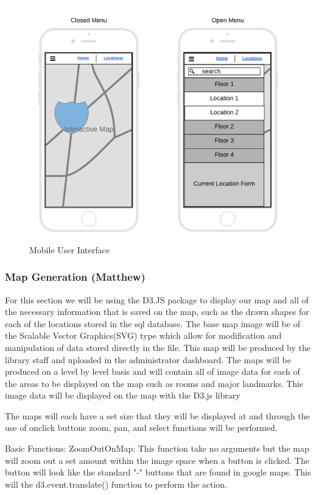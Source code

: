 \documentclass[letterpaper,10pt,titlepage, onecolumn, compsoc]{IEEEtran}
\begin{document}
\begin{figure}[h!]
\centering
\includegraphics[scale=.6]{images/mobile-user-interface.png}
\caption{Mobile User Interface}
\label{fig:method}
\end{figure}

\subsubsection{Map Generation (Matthew)}
For this section we will be using the D3.JS package to display our map and all of the necessary information that is saved on the map, such as the drawn shapes for each of the locations stored in the sql database. The base map image will be of the Scalable Vector Graphics(SVG) type which allow for modification and manipulation of data stored directly in the file. This map will be produced by the library staff and uploaded in the administrator dashboard. The maps will be produced on a level by level basis and will contain all of image data for each of the areas to be displayed on the map such as rooms and major landmarks. This image data will be displayed on the map with the D3.js library

The maps will each have a set size  that they will be displayed at and  through the use of onclick buttons zoom, pan, and select functions will be performed.

Basic Functions:
ZoomOutOnMap: This function take no arguments but the map will zoom out a set amount within the image space when a button is clicked. The button will look like the standard "-" buttons that are found in google maps. This will the d3.event.translate() function to perform the action.
\end{document}
